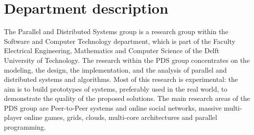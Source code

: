 \section{Department description}
The Parallel and Distributed Systems group is a research group within the Software and Computer Technology department, which is part of the Faculty Electrical Engineering, Mathematics and Computer Science of the Delft University of Technology. The research within the PDS group concentrates on the modeling, the design, the implementation, and the analysis of parallel and distributed systems and algorithms. Most of this research is experimental: the aim is to build prototypes of systems, preferably used in the real world, to demonstrate the quality of the proposed solutions. The main research areas of the PDS group are Peer-to-Peer systems and online social networks, massive multi-player online games, grids, clouds, multi-core architectures and parallel programming. 
